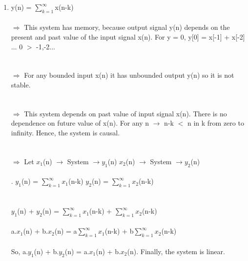 \documentclass[10pt,a4paper, margin=1in]{article}
\begin{document}
\begin{enumerate}
\begin{enumerate}
    
    
    
    \item %
    y(n) = $\sum_{k=1}^{\infty}$x(n-k)\\\\
    
   $\Rightarrow$ This system has memory, because output signal y(n) depends on the present and past value of the input signal x(n). For y = 0, y[0] = x[-1] + x[-2] ... 0 $>$ -1,-2... \\\\\\
    $\Rightarrow$ For any bounded input x(n) it has unbounded output y(n) so it is not stable.\\\\\\
    $\Rightarrow$ This system depends on past value of input signal x(n). There is no dependence on future value of x(n). For any n  $\rightarrow$ n-k $<$ n in k from zero to infinity. Hence, the system is causal.\\\\\\
   $\Rightarrow$ Let $x_{1}$(n) $\rightarrow$  System $\rightarrow y_{1}$(n) \hspace{5cm} $x_{2}$(n) $\rightarrow$  System $\rightarrow y_{2}$(n)\\\\
    .\hspace{0.5cm} $y_{1}$(n) = $\sum_{k=1}^{\infty} x_{1}$(n-k) \hspace{6cm} $y_{2}$(n) = $\sum_{k=1}^{\infty} x_{2}$(n-k)\\\\\\
    $y_{1}$(n) + $y_{2}$(n) = $\sum_{k=1}^{\infty} x_{1}$(n-k) + $\sum_{k=1}^{\infty} x_{2}$(n-k)\\\\
    a.$x_{1}$(n) + b.$x_{2}$(n) = a$\sum_{k=1}^{\infty} x_{1}$(n-k) + b$\sum_{k=1}^{\infty} x_{2}$(n-k)\\\\
    So, a.$y_{1}$(n) + b.$y_{2}$(n) = a.$x_{1}$(n) + b.$x_{2}$(n). Finally, the system is linear.
    \newpage
   

\end{enumerate}
\end{enumerate}
\end{document}
